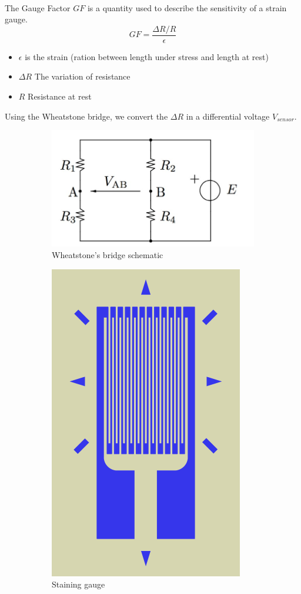 \documentclass{article}[12pt]
\begin{document}
\paragraph{}
The Gauge Factor $GF$ is a quantity used to describe the sensitivity of a strain gauge. \cite{bucci}
\begin{equation}
GF=\dfrac{\Delta R/R}{\epsilon}
\end{equation}
\begin{itemize}
\item $\epsilon$ is the strain (ration between length under stress and length at rest)
\item $\Delta R$ The variation of resistance
\item $R$ Resistance at rest
\end{itemize}
Using the Wheatstone bridge, we convert the $\Delta R$ in a differential voltage $V_{sensor}$.
\begin{figure}[H]
\centering
\begin{subfigure}{.5\textwidth}
  \centering
  \includegraphics[width=.8\linewidth]{figures/wheatstone.jpg}
  \caption{Wheatstone's bridge schematic}
  \label{fig:Wheatstone}
\end{subfigure}%
\begin{subfigure}{.5\textwidth}
  \centering
  \includegraphics[width=.4\linewidth]{figures/Strain_gauge.png}
  \caption{Staining gauge \cite{LeBerre-2016}}
  \label{fig:sub2}
\end{subfigure}
\caption{}
\label{fig:test}
\end{figure}
\end{document}

